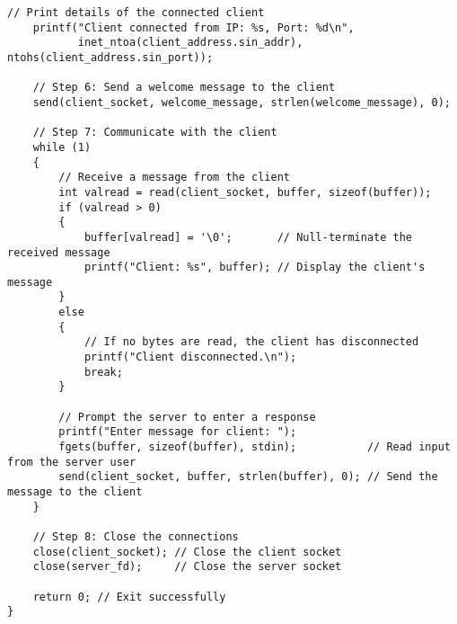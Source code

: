 \documentclass[a4paper,12pt]{article}
\begin{document}
\begin{lstlisting}[caption={Distributed System Server Code}, label={lst:distributed-server}]
    // Print details of the connected client
    printf("Client connected from IP: %s, Port: %d\n",
           inet_ntoa(client_address.sin_addr), ntohs(client_address.sin_port));

    // Step 6: Send a welcome message to the client
    send(client_socket, welcome_message, strlen(welcome_message), 0);

    // Step 7: Communicate with the client
    while (1)
    {
        // Receive a message from the client
        int valread = read(client_socket, buffer, sizeof(buffer));
        if (valread > 0)
        {
            buffer[valread] = '\0';       // Null-terminate the received message
            printf("Client: %s", buffer); // Display the client's message
        }
        else
        {
            // If no bytes are read, the client has disconnected
            printf("Client disconnected.\n");
            break;
        }

        // Prompt the server to enter a response
        printf("Enter message for client: ");
        fgets(buffer, sizeof(buffer), stdin);           // Read input from the server user
        send(client_socket, buffer, strlen(buffer), 0); // Send the message to the client
    }

    // Step 8: Close the connections
    close(client_socket); // Close the client socket
    close(server_fd);     // Close the server socket

    return 0; // Exit successfully
}

\end{lstlisting}
\end{document}
